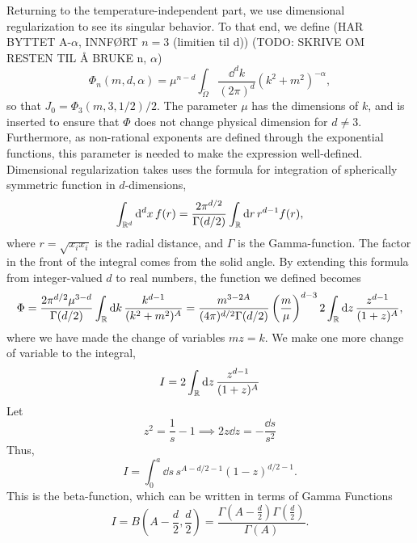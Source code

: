 Returning to the temperature-independent part, we use dimensional regularization to see its singular behavior.
To that end, we define
(HAR BYTTET A-$\alpha$, INNFØRT $n=3$ (limitien til d))
(TODO: SKRIVE OM RESTEN TIL Å BRUKE n, $\alpha$)
\begin{equation}
    \label{def dimreg integral}
    \Phi_n(m, d, \alpha) = \mu^{n - d}\int_{\tilde \Omega} \frac{\dd^d k}{(2 \pi)^d} (k^2 + m^2)^{-\alpha},
\end{equation}
so that $J_0 = \Phi_3(m, 3, 1/2) / 2$.
The parameter $\mu$ has the dimensions of $k$, and is inserted to ensure that $\Phi$ does not change physical dimension for $d \neq 3$.
Furthermore, as non-rational exponents are defined through the exponential functions, this parameter is needed to make the expression well-defined.
Dimensional regularization takes uses the formula for integration of spherically symmetric function in $d$-dimensions,
\begin{equation}
    \int_{\mathbb{R}^d} \dd^d x \, f(r) 
    = \frac{2 \pi^{d/2}}{\Gamma(d/2)} \int_{\mathbb{R}} \dd r \, r^{d-1}f(r),
\end{equation}
where $r = \sqrt{x_i x_i}$ is the radial distance, and $\Gamma$ is the Gamma-function.
The factor in the front of the integral comes from the solid angle.
By extending this formula from integer-valued $d$ to real numbers, the function we defined becomes
\begin{equation}
    \Phi 
    = \frac{2 \pi^{d/2} \mu^{3 - d} }{\Gamma(d/2)} \int_{\mathbb{R}} \dd k \, 
    \frac{k^{d-1}}{(k^2 + m^2)^A}
    = \frac{m^{3-2A}}{(4 \pi)^{d / 2}\Gamma(d/2)} 
    \left(\frac{m}{\mu}\right)^{d-3} 
    2 \int_{\mathbb{R}} \dd z \, \frac{z^{d - 1}}{(1 + z)^A}, 
\end{equation}
where we have made the change of variables $m z = k$.
We make one more change of variable to the integral,
\begin{equation}
    I = 2 \int_{\mathbb{R}} \dd z \, \frac{z^{d - 1}}{(1 + z)^A}
\end{equation}
Let
\begin{equation}
    z^2 = \frac{1}{s} - 1 \implies 2 z \dd z = - \frac{\dd s}{s^2}
\end{equation}
Thus,
\begin{equation}
    I = \int_0^a \dd s \, s^{A - d/2 - 1} (1 - z)^{d/2 - 1}.
\end{equation}
This is the beta-function, which can be written in terms of Gamma Functions~\cite{Peskin:IntroQFT}
\begin{equation}
    I = B\left(A - \frac{d}{2}, \frac{d}{2}\right) 
    = \frac{\Gamma\left(A - \frac{d}{2}\right) \Gamma\left(\frac{d}{2}\right)}{\Gamma(A)}.
\end{equation}
